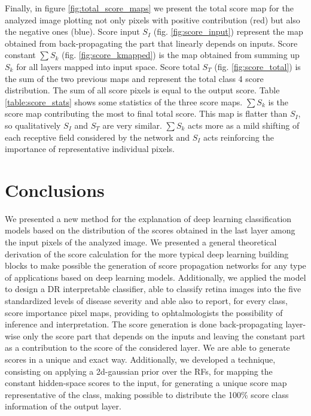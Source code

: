 \documentclass[review]{elsarticle}
\theoremstyle{definition} %
\theoremstyle{remark}
\begin{document}
Finally, in figure \ref{fig:total_score_maps} we present the total score map for the analyzed image plotting not only pixels with positive contribution (red) but also the negative ones (blue). Score input $S_I$ (fig. \ref{fig:score_input}) represent the map obtained from back-propagating the part that linearly depends on inputs. Score constant $\sum S_k$ (fig. \ref{fig:score_kmapped}) is the map obtained from summing up $S_k$ for all layers mapped into input space. Score total $S_T$ (fig. \ref{fig:score_total}) is the sum of the two previous maps and represent the total class 4 score distribution. The sum of all score pixels is equal to the output score. Table \ref{table:score_stats} shows some statistics of the three score maps. $\sum S_k$ is the score map contributing the most to final total score. This map is flatter than $S_I$, so qualitatively $S_I$ and $S_T$ are very similar. $\sum S_k$ acts more as a mild shifting of each receptive field considered by the network and $S_I$ acts reinforcing the importance of representative individual pixels.


\section{Conclusions}\label{sec:conclusions}

We presented a new method for the explanation of deep learning classification models based on the distribution of the scores obtained in the last layer among the input pixels of the analyzed image. We presented a general theoretical derivation of the score calculation for the more typical deep learning building blocks to make possible the generation of score propagation networks for any type of applications based on deep learning models.  Additionally, we applied the model to design a DR interpretable classifier, able to classify retina images into the five standardized levels of disease severity and able also to report, for every class, score importance pixel maps, providing to ophtalmologists the possibility of inference and interpretation. The score generation is done back-propagating layer-wise only the score part that depends on the inputs and leaving the constant part as a contribution to the score of the considered layer. We are able to generate scores in a unique and exact way. Additionally, we developed a technique, consisting on applying a 2d-gaussian prior over the RFs, for mapping the constant hidden-space scores to the input, for generating a unique score map representative of the class, making possible to distribute the 100\% score class information of the output layer. 
\end{document}
